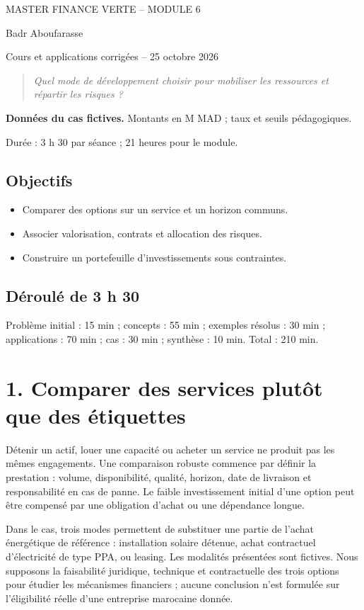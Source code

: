 \documentclass[12pt,a4paper]{article}
\begin{document}
\begin{center}{\small MASTER FINANCE VERTE -- MODULE 6}\par\vspace{8pt}{\Large\bfseries Séance 4 -- Choix stratégiques : détenir, contractualiser, s’associer}\par\vspace{6pt}Badr Aboufarasse\par{\small Cours et applications corrigées -- 25 octobre 2026}\end{center}
\begin{quote}\itshape Quel mode de développement choisir pour mobiliser les ressources et répartir les risques ?\end{quote}
\textbf{Données du cas fictives.} Montants en M MAD ; taux et seuils pédagogiques.\par Durée : 3 h 30 par séance ; 21 heures pour le module.

\subsection*{Objectifs}
\begin{itemize}\item Comparer des options sur un service et un horizon communs.\item Associer valorisation, contrats et allocation des risques.\item Construire un portefeuille d’investissements sous contraintes.\end{itemize}
\subsection*{Déroulé de 3 h 30}
Problème initial : 15 min ; concepts : 55 min ; exemples résolus : 30 min ; applications : 70 min ; cas : 30 min ; synthèse : 10 min. Total : 210 min.

\section*{1. Comparer des services plutôt que des étiquettes}
Détenir un actif, louer une capacité ou acheter un service ne produit pas les mêmes engagements. Une comparaison robuste commence par définir la prestation : volume, disponibilité, qualité, horizon, date de livraison et responsabilité en cas de panne. Le faible investissement initial d’une option peut être compensé par une obligation d’achat ou une dépendance longue.


Dans le cas, trois modes permettent de substituer une partie de l’achat énergétique de référence : installation solaire détenue, achat contractuel d’électricité de type PPA, ou leasing. Les modalités présentées sont fictives. Nous supposons la faisabilité juridique, technique et contractuelle des trois options pour étudier les mécanismes financiers ; aucune conclusion n’est formulée sur l’éligibilité réelle d’une entreprise marocaine donnée.
\end{document}
